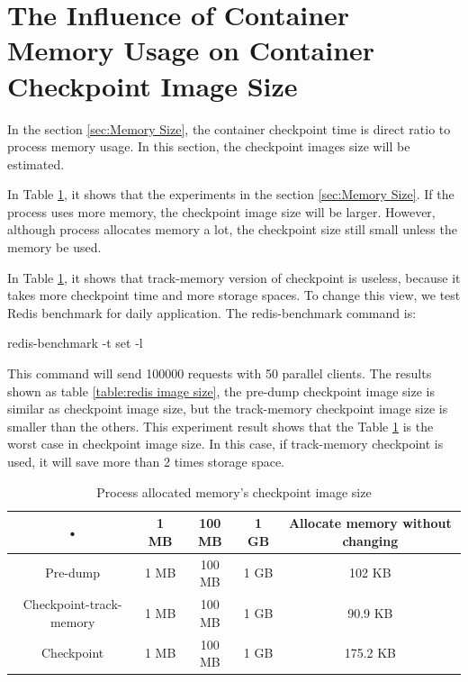\section{The Influence of Container Memory Usage on Container Checkpoint Image Size}
In the section \ref{sec:Memory Size}, the container checkpoint time is direct ratio to process memory usage. In this section, the checkpoint images size will be estimated.

In Table \ref{table:process image size}, it shows that the experiments in the section \ref{sec:Memory Size}. If the process uses more memory, the checkpoint image size will be larger. However, although process allocates memory a lot, the checkpoint size still small unless the memory be used.

In Table \ref{table:process image size}, it shows that track-memory version of checkpoint is useless, because it takes more checkpoint time and more storage spaces. To change this view, we test Redis benchmark for daily application. The redis-benchmark command is:
\begin{center}
redis-benchmark -t set -l
\end{center}

This command will send 100000 requests with 50 parallel clients. The results shown as table \ref{table:redis image size}, the pre-dump checkpoint image size is similar as checkpoint image size, but the track-memory checkpoint image size is smaller than the others. This experiment result shows that the Table \ref{table:process image size} is the worst case in checkpoint image size. In this case, if track-memory checkpoint is used, it will save more than 2 times storage space.

\begin{table}[hbtp]
\begin{center}
\begin{tabular}{|c|c|c|c|c|}\hline 
• & 1 MB & 100 MB & 1 GB & Allocate memory without changing\\ 
\hline 
Pre-dump & 1 MB & 100 MB & 1 GB & 102 KB\\ 
\hline 
Checkpoint-track-memory & 1 MB & 100 MB & 1 GB & 90.9 KB \\ 
\hline 
Checkpoint & 1 MB & 100 MB & 1 GB & 175.2 KB \\ 
\hline 
\end{tabular}
\caption{Process allocated memory's checkpoint image size}
\label{table:process image size}
\end{center}
\end{table}

